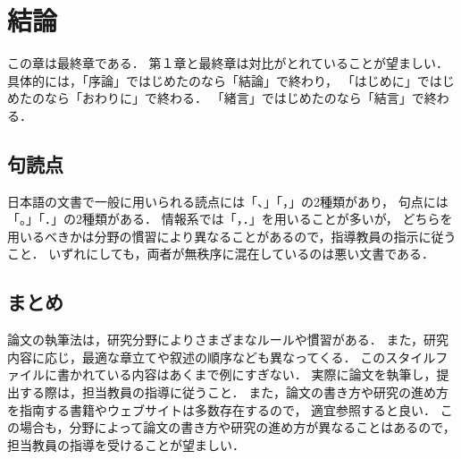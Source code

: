 \chapter{結論}
\thispagestyle{plain}

この章は最終章である．
第１章と最終章は対比がとれていることが望ましい．
具体的には，「序論」ではじめたのなら「結論」で終わり，
「はじめに」ではじめたのなら「おわりに」で終わる．
「緒言」ではじめたのなら「結言」で終わる．

\section{句読点}
日本語の文書で一般に用いられる読点には「、」「，」の2種類があり，
句点には「。」「．」の2種類がある．
情報系では「，．」を用いることが多いが，
どちらを用いるべきかは分野の慣習により異なることがあるので，指導教員の指示に従うこと．
いずれにしても，両者が無秩序に混在しているのは悪い文書である．

\section{まとめ}
論文の執筆法は，研究分野によりさまざまなルールや慣習がある．
また，研究内容に応じ，最適な章立てや叙述の順序なども異なってくる．
このスタイルファイルに書かれている内容はあくまで例にすぎない．
実際に論文を執筆し，提出する際は，担当教員の指導に従うこと．
また，論文の書き方や研究の進め方を指南する書籍やウェブサイトは多数存在するので，
適宜参照すると良い．
この場合も，分野によって論文の書き方や研究の進め方が異なることはあるので，
担当教員の指導を受けることが望ましい．
